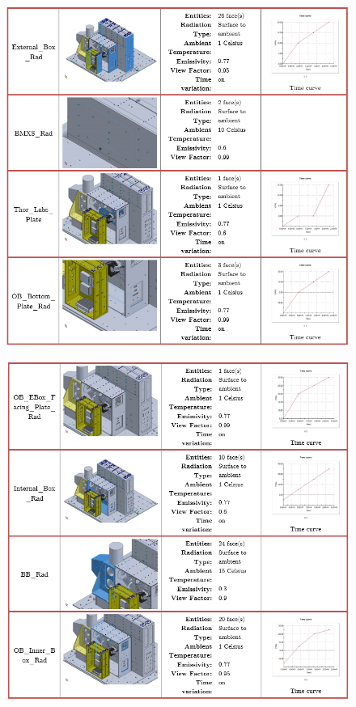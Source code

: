 \begin{figure}
    \centering
    \includegraphics[width=\textwidth]{thermal_load_images/sunrise_TL_images/sunrise_5.PNG}
\end{figure}

\begin{figure}
    \centering
    \includegraphics[width=\textwidth]{thermal_load_images/sunrise_TL_images/sunrise_6.PNG}
\end{figure}

